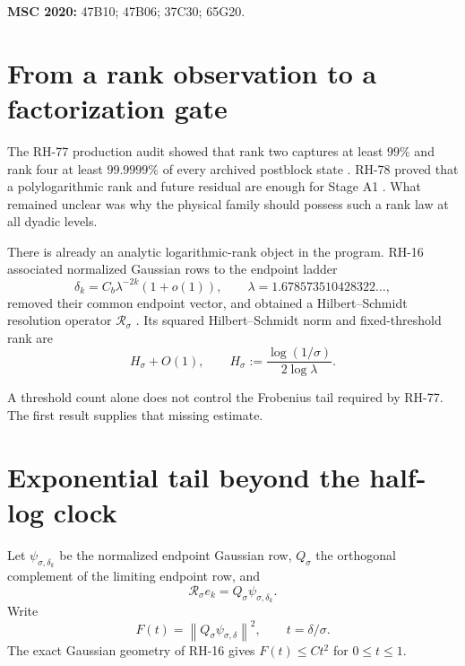 \documentclass[11pt]{article}
\theoremstyle{remark}
\newcommand{\norm}[1]{\left\lVert#1\right\rVert}
\newcommand{\cR}{\mathcal R}
\begin{document}
\medskip
\noindent\textbf{MSC 2020:} 47B10; 47B06; 37C30; 65G20.

\section{From a rank observation to a factorization gate}

The RH-77 production audit showed that rank two captures at least $99\%$ and
rank four at least $99.9999\%$ of every archived postblock state
\citep{WangEffectiveRank2026}.  RH-78 proved that a polylogarithmic rank and
future residual are enough for Stage A1 \citep{WangTwoCorridors2026}.  What
remained unclear was why the physical family should possess such a rank law at
all dyadic levels.

There is already an analytic logarithmic-rank object in the program.  RH-16
associated normalized Gaussian rows to the endpoint ladder
\begin{equation}
 \delta_k=C_b\lambda^{-2k}(1+o(1)),
 \qquad \lambda=1.678573510428322\ldots,
 \label{eq:ladder}
\end{equation}
removed their common endpoint vector, and obtained a Hilbert--Schmidt
resolution operator $\cR_\sigma$ \citep{WangEndpointRank2026}.  Its squared
Hilbert--Schmidt norm and fixed-threshold rank are
\begin{equation}
 H_\sigma+O(1),
 \qquad
 H_\sigma:=\frac{\log(1/\sigma)}{2\log\lambda}.
 \label{eq:clock}
\end{equation}

A threshold count alone does not control the Frobenius tail required by
RH-77.  The first result supplies that missing estimate.

\section{Exponential tail beyond the half-log clock}

Let $\psi_{\sigma,\delta_k}$ be the normalized endpoint Gaussian row,
$Q_\sigma$ the orthogonal complement of the limiting endpoint row, and
\begin{equation}
 \cR_\sigma e_k=Q_\sigma\psi_{\sigma,\delta_k}.
 \label{eq:R}
\end{equation}
Write
\begin{equation}
 F(t)=\norm{Q_\sigma\psi_{\sigma,\delta}}^2,
 \qquad t=\delta/\sigma.
 \label{eq:F}
\end{equation}
The exact Gaussian geometry of RH-16 gives $F(t)\le Ct^2$ for $0\le t\le1$.
\end{document}
